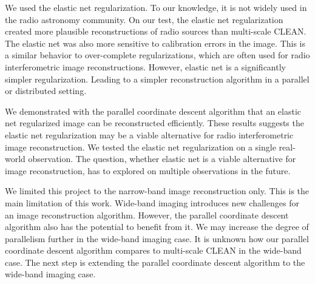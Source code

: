 
We used the elastic net regularization. To our knowledge, it is not widely used in the radio astronomy community. On our test, the elastic net regularization created more plausible reconstructions of radio sources than multi-scale CLEAN. The elastic net was also more sensitive to calibration errors in the image. This is a similar behavior to over-complete regularizations, which are often used for radio interferometric image reconstructions. However, elastic net is a significantly simpler regularization. Leading to a simpler reconstruction algorithm in a parallel or distributed setting. 

We demonstrated with the parallel coordinate descent algorithm that an elastic net regularized image can be reconstructed efficiently. These results suggests the elastic net regularization may be a viable alternative for radio interferometric image reconstruction. We tested the elastic net regularization on a single real-world observation. The question, whether elastic net is a viable alternative for image reconstruction, has to explored on multiple observations in the future.

We limited this project to the narrow-band image reconstruction only. This is the main limitation of this work. Wide-band imaging introduces new challenges for an image reconstruction algorithm. However, the parallel coordinate descent algorithm also has the potential to benefit from it. We may increase the degree of parallelism further in the wide-band imaging case. It is unknown how our parallel coordinate descent algorithm compares to multi-scale CLEAN in the wide-band case. The next step is extending the parallel coordinate descent algorithm to the wide-band imaging case.
 
